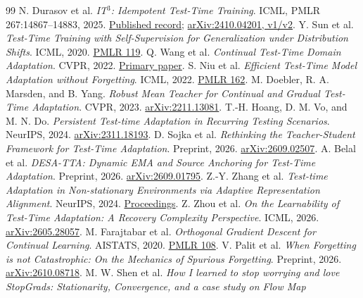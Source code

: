 \documentclass[11pt,a4paper]{article}
\begin{document}
\begin{thebibliography}{99}
 N. Durasov et al. \emph{IT$^3$: Idempotent Test-Time Training}.
ICML, PMLR 267:14867--14883, 2025.
\href{https://proceedings.mlr.press/v267/durasov25a.html}{Published record};
\href{https://arxiv.org/abs/2410.04201}{arXiv:2410.04201, v1/v2}.
 Y. Sun et al. \emph{Test-Time Training with Self-Supervision
for Generalization under Distribution Shifts}. ICML, 2020.
\href{https://proceedings.mlr.press/v119/sun20b.html}{PMLR 119}.
 Q. Wang et al. \emph{Continual Test-Time Domain Adaptation}.
CVPR, 2022.
\href{https://openaccess.thecvf.com/content/CVPR2022/html/Wang_Continual_Test-Time_Domain_Adaptation_CVPR_2022_paper.html}{Primary paper}.
 S. Niu et al. \emph{Efficient Test-Time Model Adaptation
without Forgetting}. ICML, 2022.
\href{https://proceedings.mlr.press/v162/niu22a.html}{PMLR 162}.
 M. Doebler, R. A. Marsden, and B. Yang. \emph{Robust Mean
Teacher for Continual and Gradual Test-Time Adaptation}. CVPR, 2023.
\href{https://arxiv.org/abs/2211.13081}{arXiv:2211.13081}.
 T.-H. Hoang, D. M. Vo, and M. N. Do. \emph{Persistent
Test-time Adaptation in Recurring Testing Scenarios}. NeurIPS, 2024.
\href{https://arxiv.org/abs/2311.18193}{arXiv:2311.18193}.
 D. Sojka et al. \emph{Rethinking the Teacher-Student
Framework for Test-Time Adaptation}. Preprint, 2026.
\href{https://arxiv.org/abs/2609.02507}{arXiv:2609.02507}.
 A. Belal et al. \emph{DESA-TTA: Dynamic EMA and Source
Anchoring for Test-Time Adaptation}. Preprint, 2026.
\href{https://arxiv.org/abs/2609.01795}{arXiv:2609.01795}.
 Z.-Y. Zhang et al. \emph{Test-time Adaptation in
Non-stationary Environments via Adaptive Representation Alignment}.
NeurIPS, 2024.
\href{https://papers.neurips.cc/paper_files/paper/2024/hash/abe31a12e83111fdf2cfd54deed5a2ce-Abstract-Conference.html}{Proceedings}.
 Z. Zhou et al. \emph{On the Learnability of Test-Time
Adaptation: A Recovery Complexity Perspective}. ICML, 2026.
\href{https://arxiv.org/abs/2605.28057}{arXiv:2605.28057}.
 M. Farajtabar et al. \emph{Orthogonal Gradient Descent for
Continual Learning}. AISTATS, 2020.
\href{https://proceedings.mlr.press/v108/farajtabar20a.html}{PMLR 108}.
 V. Palit et al. \emph{When Forgetting is not Catastrophic:
On the Mechanics of Spurious Forgetting}. Preprint, 2026.
\href{https://arxiv.org/abs/2610.08718}{arXiv:2610.08718}.
 M. W. Shen et al. \emph{How I learned to stop worrying
and love StopGrads: Stationarity, Convergence, and a case study on Flow Map
}
\end{thebibliography}
\end{document}
